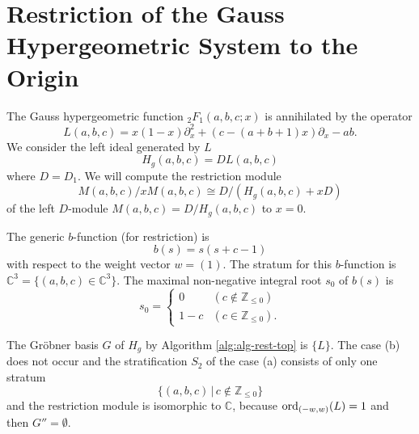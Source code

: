 \documentclass{article}
\def\CC{\mathbb{C}}
\def\pd#1{\partial_{#1}}
\def\aalpha{a}
\def\bbeta{b}
\def\ggamma{c}
\def\Hg{H_g}
\begin{document}
\section{Restriction of the Gauss Hypergeometric System to the Origin} \label{sec:gauss-hg}

The Gauss hypergeometric function ${}_2F_1(a,b,c;x)$ is annihilated by
the operator
\begin{equation} \label{eq:gauss_hg_op}
L(\aalpha, \bbeta, \ggamma) = x(1-x)\pd{x}^2 + (\ggamma - (\aalpha + \bbeta + 1)x)\pd{x} - \aalpha \bbeta.
\end{equation}
We consider the left ideal generated by $L$
$$
\Hg(\aalpha, \bbeta, \ggamma) = D L(\aalpha, \bbeta, \ggamma)
$$
where $D=D_1$.
We will compute the restriction module
$$M(\aalpha, \bbeta, \ggamma)/xM(\aalpha, \bbeta, \ggamma) \cong D/(\Hg(\aalpha, \bbeta, \ggamma) + x D)$$ 
of the left $D$-module $M(\aalpha, \bbeta, \ggamma) = D/\Hg(\aalpha, \bbeta, \ggamma)$
to $x = 0$.

The generic $b$-function (for restriction)
is 
$$
b(s) = s(s+\ggamma-1)
$$
with respect to the weight vector $w=(1)$.
The stratum for this $b$-function is 
$\CC^3=\{ (\aalpha, \bbeta, \ggamma) \in \CC^3 \}$.
The maximal non-negative integral root $s_0$ of
$b(s)$ is
$$
s_0 = 
\begin{cases}
0 & (\ggamma \notin \mathbb{Z}_{\leq 0}) \\
1-\ggamma & (\ggamma \in \mathbb{Z}_{\leq 0}).
\end{cases}
$$

The Gr\"obner basis $G$ of $\Hg$ by Algorithm \ref{alg:alg-rest-top}
is $\{ L \}$.
The case (b) does not occur and the stratification $S_2$
of the case (a) consists of only one stratum
$$
 \{ (\aalpha,\bbeta,\ggamma) \,|\, \ggamma \notin \mathbb{Z}_{\leq 0} \}
$$
and the restriction module is isomorphic to $\mathbb{C}$,
because ${\rm ord}_{(-w,w)}(L)=1$ and then $G''=\emptyset$.
\end{document}
